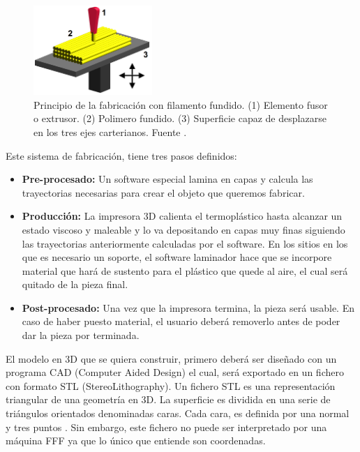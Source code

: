 \begin{figure}[!ht]
    \centering
    \includegraphics[width=0.4\textwidth]{images/FDM_by_Zureks.png}
    \caption[Principio de la fabricación con filamento fundido]{Principio de la fabricación con filamento fundido. (1) Elemento fusor o extrusor. (2) Polimero fundido. (3) Superficie capaz de desplazarse en los tres ejes carterianos. Fuente \cite{fundamentoFDM}.}
    \label{fig:impr_fdm}
\end{figure}

Este sistema de fabricación, tiene tres pasos definidos:

\begin{itemize}
    \item \textbf{Pre-procesado:} Un software especial lamina en capas y calcula las trayectorias necesarias para crear el objeto que queremos fabricar.
    \item \textbf{Producción:} La impresora 3D calienta el termoplástico hasta alcanzar un estado viscoso y maleable y lo va depositando en capas muy finas siguiendo las trayectorias anteriormente calculadas por el software. En los sitios en los que es necesario un soporte, el software laminador hace que se incorpore material que hará de sustento para el plástico que quede al aire, el cual será quitado de la pieza final.
    \item \textbf{Post-procesado:} Una vez que la impresora termina, la pieza será usable. En caso de haber puesto material, el usuario deberá removerlo antes de poder dar la pieza por terminada.
\end{itemize}

El modelo en 3D que se quiera construir, primero deberá ser diseñado con un programa CAD (Computer Aided Design) el cual, será exportado en un fichero con formato STL (StereoLithography). Un fichero STL es una representación triangular de una geometría en 3D. La superficie es dividida en una serie de triángulos orientados denominadas caras. Cada cara, es definida por una normal y tres puntos \cite{stl}. Sin embargo, este fichero no puede ser interpretado por una máquina FFF ya que lo único que entiende son coordenadas.\\

